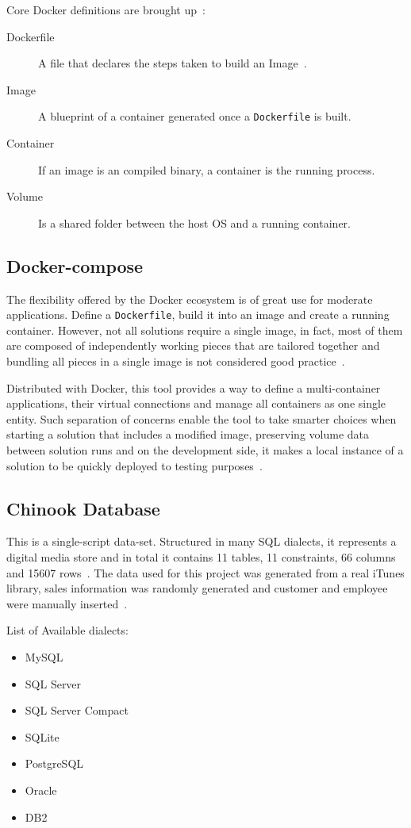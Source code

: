 Core Docker definitions are brought up~\cite{dockeroverview}:
\begin{description}
\item[Dockerfile] A file that declares the steps taken to build an Image~\cite{dockerfile}.
\item[Image] A blueprint of a container generated once a \texttt{Dockerfile} is built.
\item[Container] If an image is an compiled binary, a container is the running process. 
\item[Volume] Is a shared folder between the host \gls{OS} and a running container.
\end{description}

\subsection{Docker-compose}
The flexibility offered by the Docker ecosystem is of great use for moderate applications. Define a \texttt{Dockerfile}, build it into an image and create a running container. However, not all solutions require a single image, in fact, most of them are composed of independently working pieces that are tailored together and bundling all pieces in a single image is not considered good practice~\cite{dockerfag}.

Distributed with Docker, this tool provides a way to define a multi-container applications, their virtual connections and manage all containers as one single entity. Such separation of concerns enable the tool to take smarter choices when starting a solution that includes a modified image, preserving volume data between solution runs and on the development side, it makes a local instance of a solution to be quickly deployed to testing purposes~\cite{compose}. 

\subsection{Chinook Database}
This is a single-script data-set. Structured in many \gls{SQL} dialects, it represents a  digital media store and in total it contains 11 tables, 11 constraints, 66 columns and 15607 rows~\cite{schemaspy}. The data used for this project was generated from a real iTunes library, sales information was randomly generated and customer and employee were manually inserted~\cite{chinook}.

List of Available dialects:
\begin{itemize}
\item MySQL
\item SQL Server
\item SQL Server Compact
\item SQLite
\item PostgreSQL
\item Oracle
\item DB2
\end{itemize}

